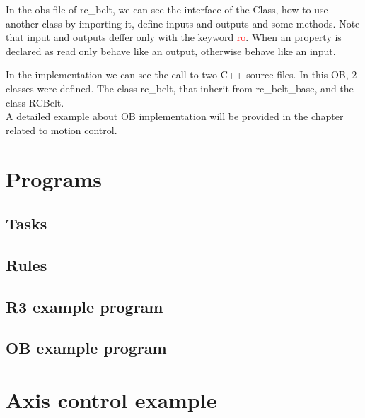 In the obs file of rc\_belt, we can see the interface of the Class, how to use another class by importing it, define inputs and outputs and some methods. Note that input and outputs deffer only with the keyword \textcolor{red}{ro}. When an property is declared as read only behave like an output, otherwise behave like an input.

In the implementation we can see the call to two C++ source files. In this OB, 2 classes were defined. The class rc\_belt, that inherit from rc\_belt\_base, and the class RCBelt.\\

A detailed example about OB implementation will be provided in the chapter related to motion control.

\section{Programs}

%	
\subsection{Tasks}

%	
\subsection{Rules}

%	
\subsection{R3 example program}

%	
\subsection{OB example program}


\section{Axis control example}

